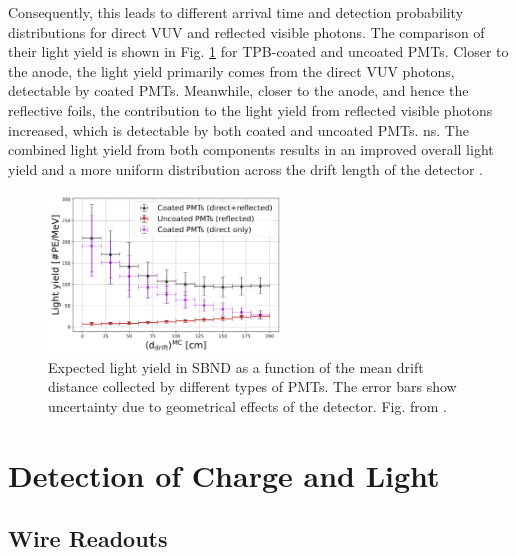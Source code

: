 Consequently, this leads to different arrival time and detection probability distributions for direct VUV and reflected visible photons.
The comparison of their light yield is shown in Fig. \ref{fig:light_yield_Diego} for TPB-coated and uncoated PMTs.
Closer to the anode, the light yield primarily comes from the direct VUV photons, detectable by coated PMTs.
Meanwhile, closer to the anode, and hence the reflective foils, the contribution to the light yield from reflected visible photons increased, which is detectable by both coated and uncoated PMTs.
ns.
The combined light yield from both components results in an improved overall light yield and a more uniform distribution across the drift length of the detector \cite{light_yield_Diego}.

\begin{figure}[htbp]
\centering    
\includegraphics[width=0.55\textwidth]{light_yield_Diego}
\caption[light_yield_Diego]{
Expected light yield in SBND as a function of the mean drift distance collected by different types of PMTs.
The error bars show uncertainty due to geometrical effects of the detector.
Fig. from \cite{light_yield_Diego}.
}
\label{fig:light_yield_Diego}
\end{figure}


\section{Detection of Charge and Light}

\label{sec3:detection}

\subsection{Wire Readouts}


